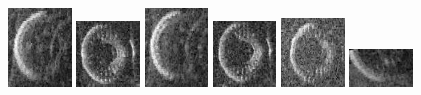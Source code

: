 \begin{figure}
    \includegraphics[width=0.15\textwidth]{chapters/images/dataset/all-class-images/tire/tire-102.jpg}
    \includegraphics[width=0.15\textwidth]{chapters/images/dataset/all-class-images/tire/tire-289.jpg}
    \includegraphics[width=0.15\textwidth]{chapters/images/dataset/all-class-images/tire/tire-112.jpg}
    \includegraphics[width=0.15\textwidth]{chapters/images/dataset/all-class-images/tire/tire-214.jpg}
    \includegraphics[width=0.15\textwidth]{chapters/images/dataset/all-class-images/tire/tire-89.jpg}
    \includegraphics[width=0.15\textwidth]{chapters/images/dataset/all-class-images/tire/tire-44.jpg}
    

\end{figure}
